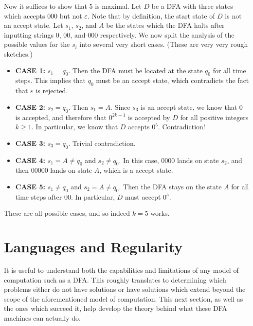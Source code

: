\documentclass[11pt]{article}
\newcounter{enum}
\begin{document}
\begin{enumerate}
Now it suffices to show that $5$ is maximal.  Let $D$ be a DFA with three states which accepts $000$ but not $\varepsilon$.  Note that by definition, the start state of $D$ is not an accept state.  Let $s_1$, $s_2$, and $A$ be the states which the DFA halts after inputting strings $0$, $00$, and $000$ respectively.  We now split the analysis of the possible values for the $s_i$ into several very short cases.  (These are very very rough sketches.)

\begin{itemize}

\item\textbf{CASE 1: } $s_1 = q_0$.  Then the DFA must be located at the state $q_0$ for all time steps.  This implies that $q_0$ must be an accept state, which contradicts the fact that $\varepsilon$ is rejected.

\item\textbf{CASE 2: } $s_2 = q_0$.  Then $s_1=A$.  Since $s_3$ is an accept state, we know that $0$ is accepted, and therefore that $0^{2k-1}$ is accepted by $D$ for all positive integers $k\geq 1$.  In particular, we know that $D$ accepts $0^5$.  Contradiction!

\item\textbf{CASE 3: } $s_3 = q_0$.  Trivial contradiction.

\item\textbf{CASE 4: } $s_1 = A\neq q_0$ and $s_2\neq q_0$.  In this case, $0000$ lands on state $s_2$, and then $00000$ lands on state $A$, which is a accept state.

\item\textbf{CASE 5: } $s_1\neq q_0$ and $s_2=A\neq q_0$.  Then the DFA stays on the state $A$ for all time steps after $00$.  In particular, $D$ must accept $0^5$.

\end{itemize}

These are all possible cases, and so indeed $k=5$ works.

\end{enumerate}

\section{Languages and Regularity}

\par It is useful to understand both the capabilities and limitations of any model of computation such as a DFA.  This roughly translates to determining which problems either do not have solutions or have solutions which extend beyond the scope of the aforementioned model of computation.  This next section, as well as the ones which succeed it, help develop the theory behind what these DFA machines can actually do.
\end{document}
